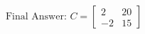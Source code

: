 \documentclass[preview]{standalone}
\begin{document}
\begin{align*}
\text{Final Answer: } C = \begin{bmatrix} 2 & 20 \\ -2 & 15 \end{bmatrix}
\end{align*}
\end{document}

